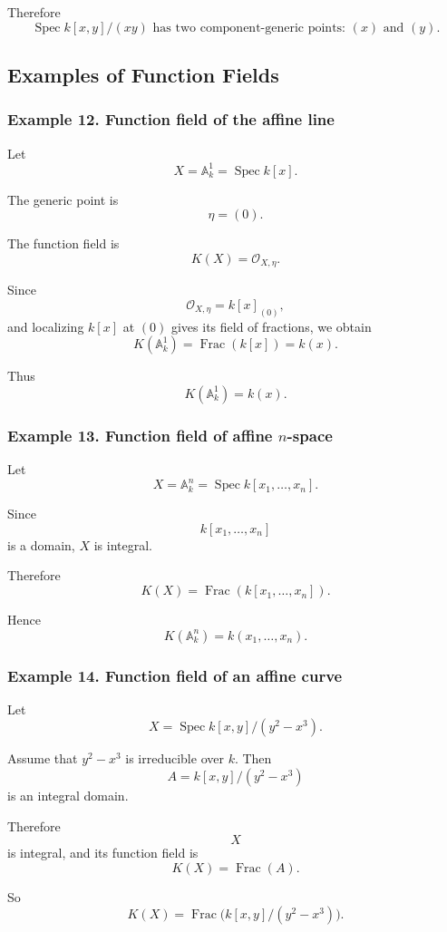 \documentclass[12pt,a4paper]{article}
\theoremstyle{notespace}
\begin{document}
Therefore
\[
\boxed{
	\operatorname{Spec}k[x,y]/(xy)
	\text{ has two component-generic points: } (x) \text{ and } (y).
}
\]

\subsection{Examples of Function Fields}

\subsubsection*{Example 12. Function field of the affine line}

Let
\[
X=\mathbb{A}^1_k=\operatorname{Spec}k[x].
\]

The generic point is
\[
\eta=(0).
\]

The function field is
\[
K(X)=\mathcal{O}_{X,\eta}.
\]

Since
\[
\mathcal{O}_{X,\eta}=k[x]_{(0)},
\]
and localizing \(k[x]\) at \((0)\) gives its field of fractions, we obtain
\[
K(\mathbb{A}^1_k)=\operatorname{Frac}(k[x])=k(x).
\]

Thus
\[
\boxed{
	K(\mathbb{A}^1_k)=k(x).
}
\]

\subsubsection*{Example 13. Function field of affine \(n\)-space}

Let
\[
X=\mathbb{A}^n_k=\operatorname{Spec}k[x_1,\dots,x_n].
\]

Since
\[
k[x_1,\dots,x_n]
\]
is a domain, \(X\) is integral.

Therefore
\[
K(X)
=
\operatorname{Frac}(k[x_1,\dots,x_n]).
\]

Hence
\[
\boxed{
	K(\mathbb{A}^n_k)=k(x_1,\dots,x_n).
}
\]

\subsubsection*{Example 14. Function field of an affine curve}

Let
\[
X=\operatorname{Spec}k[x,y]/(y^2-x^3).
\]

Assume that \(y^2-x^3\) is irreducible over \(k\). Then
\[
A=k[x,y]/(y^2-x^3)
\]
is an integral domain.

Therefore
\[
X
\]
is integral, and its function field is
\[
K(X)=\operatorname{Frac}(A).
\]

So
\[
K(X)
=
\operatorname{Frac}\bigl(k[x,y]/(y^2-x^3)\bigr).
\]
\end{document}
